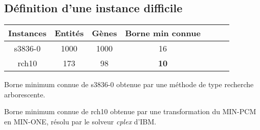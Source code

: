 \documentclass{beamer}
\begin{document}
\subsection{Définition d'une instance difficile}
\begin{frame}{}%
	\begin{center}
		\begin{tabular}{|c|c|c|c|c|c|c|}
		\hline 
		Instances & Entités & Gènes & Borne min connue \\ 
		\hline 
		s3836-0 & 1000 & 1000 & 16\\ 
		\hline
		rch10 & 173 & 98 & \textbf{10} \\ 
		\hline
		\end{tabular} 
	\end{center}

	\begin{overprint}
		\begin{itemize}
			 {\item Borne minimum connue de  s3836-0 obtenue par une méthode de type recherche arborescente.}
			 {\item Borne minimum connue de  rch10 obtenue par une transformation du MIN-PCM en MIN-ONE, résolu par le solveur \emph{cplex} d'IBM.}
		\end{itemize}
		{
			\begin{figure}
				
			\end{figure}
		}
		{
			\begin{figure}
				
			\end{figure}
		}
	\end{overprint} 
\end{frame}
\end{document}
